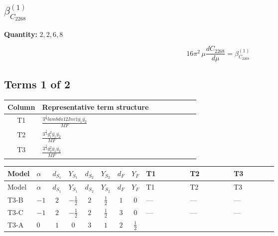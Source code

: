 \documentclass[8pt]{article}
\begin{document}
\begin{landscape}
\section*{$\beta_{C_{2268}}^{(1)}$}
\noindent\textbf{Quantity: }$\mathrm{2,2,6,8}$\par\smallskip
\[16\pi^2\,\mu\frac{d C_{2268}}{d\mu}=\beta_{C_{2268}}^{(1)}\]
\subsection*{Terms 1 of 2}
\begin{center}
\begin{tabular}{@{}c >{\raggedright\arraybackslash}p{0.82\linewidth}@{}}
\toprule
Column & Representative term structure \\
\midrule
T1 & \(\displaystyle \frac{3^{\frac{3}{4}} lambda12Inv1 \overline{y_{1}} \overline{y_{2}}}{MF}\) \\
\midrule
T2 & \(\displaystyle \frac{3^{\frac{3}{4}} g_{1}^{2} \overline{y_{1}} \overline{y_{2}}}{MF}\) \\
\midrule
T3 & \(\displaystyle \frac{3^{\frac{3}{4}} g_{2}^{2} \overline{y_{1}} \overline{y_{2}}}{MF}\) \\
\midrule
\bottomrule
\end{tabular}
\end{center}
\smallskip
\tiny
\begin{longtable}{@{}llcccccc >{\raggedright\arraybackslash}p{0.21\linewidth} >{\raggedright\arraybackslash}p{0.21\linewidth} >{\raggedright\arraybackslash}p{0.21\linewidth}@{}}
\toprule
Model & $\alpha$ & $d_{S_1}$ & $Y_{S_1}$ & $d_{S_2}$ & $Y_{S_2}$ & $d_F$ & $Y_F$ & T1 & T2 & T3 \\
\midrule
\endfirsthead
\toprule
Model & $\alpha$ & $d_{S_1}$ & $Y_{S_1}$ & $d_{S_2}$ & $Y_{S_2}$ & $d_F$ & $Y_F$ & T1 & T2 & T3 \\
\midrule
\endhead
T3-B & $-1$ & $2$ & $-\frac{1}{2}$ & $2$ & $\frac{1}{2}$ & $1$ & $0$ & --- & --- & --- \\
\midrule
T3-C & $-1$ & $2$ & $-\frac{1}{2}$ & $2$ & $\frac{1}{2}$ & $3$ & $0$ & --- & --- & --- \\
\midrule
T3-A & $0$ & $1$ & $0$ & $3$ & $1$ & $2$ & $\frac{1}{2}$ & \scriptsize\adjustbox{max width=\linewidth}{$\begin{gathered} \frac{3^{\frac{3}{4}} lambda12Inv1 \overline{y_{1}} \overline{y_{2}}}{6 MF}\end{gathered}$} & \scriptsize\adjustbox{max width=\linewidth}{$\begin{gathered} \frac{3^{\frac{3}{4}} g_{1}^{2} \overline{y_{1}} \overline{y_{2}}}{8 MF}\end{gathered}$} & \scriptsize\adjustbox{max width=\linewidth}{$\begin{gathered} \frac{17 \cdot 3^{\frac{3}{4}} g_{2}^{2} \overline{y_{1}} \overline{y_{2}}}{24 MF}\end{gathered}$} \\

\end{longtable}
\end{landscape}
\end{document}
